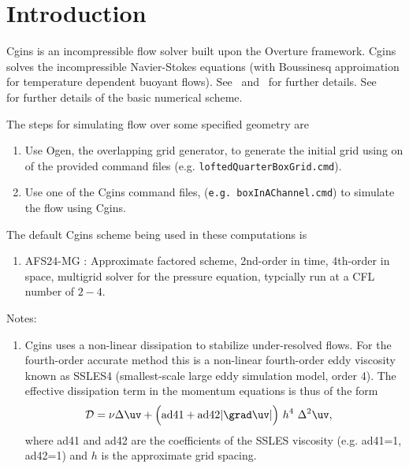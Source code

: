 \documentclass[11pt]{article}
\begin{document}
\tableofcontents

\clearpage


\section{Introduction}

Cgins is an incompressible flow solver built upon the Overture framework.
Cgins solves the incompressible Navier-Stokes equations (with Boussinesq approimation
for temperature dependent buoyant flows). See~\cite{CginsUserGuide} and~\cite{CginsReferenceManual} for further 
details. See~\cite{ICNS}~\cite{splitStep2003} for further details of the basic numerical scheme. 

The steps for simulating flow over some specified geometry are
\begin{enumerate}
  \item Use Ogen, the overlapping grid generator, to generate the initial grid using on of the provided command files (e.g. {\tt loftedQuarterBoxGrid.cmd}).
  \item Use one of the Cgins command files,  ({\tt e.g. boxInAChannel.cmd}) to simulate the flow using Cgins.
\end{enumerate}

The default Cgins scheme being used in these computations is 
\begin{enumerate}
  \item AFS24-MG : Approximate factored scheme, 2nd-order in time, 4th-order in space, multigrid solver for the pressure equation,
    typcially run at a CFL number of $2-4$. 
\end{enumerate}

Notes:
\begin{enumerate}
  \item Cgins uses a non-linear dissipation to stabilize under-resolved flows. For the fourth-order accurate method this is
    a non-linear fourth-order eddy viscosity known as SSLES4 (smallest-scale large eddy simulation model, order 4).
  The effective dissipation term in the momentum equations is thus of the form
  \begin{align*}
     \Dc & =  \nu \Delta \uv  + \Big(\text{ad41} + \text{ad42} \vert \grad\uv\vert \Big) ~h^4~ \Delta^2 \uv , 
  \end{align*}
  where ad41 and ad42 are the coefficients of the SSLES viscosity (e.g. ad41=1, ad42=1) and $h$ is the approximate grid spacing.
\end{enumerate}
\end{document}
